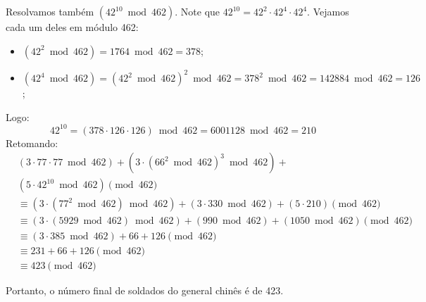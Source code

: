 Resolvamos também $(42^{10} \bmod{462})$. Note que $42^{10} = 42^2 \cdot 42^4 \cdot 42^4$. Vejamos cada um deles em módulo 462:
\begin{itemize}
	\item $(42^2 \bmod{462}) = 1764 \bmod{462} = 378$;
	\item $(42^4 \bmod{462}) = (42^2 \bmod{462})^2 \bmod{462} = 378^2 \bmod{462} = 142884 \bmod{462} = 126$;
\end{itemize}
Logo:
\begin{displaymath}
	42^{10} = (378 \cdot 126 \cdot 126) \bmod{462} = 6001128 \bmod{462} = 210
\end{displaymath}
Retomando:
\begin{align*}
	&(3 \cdot 77 \cdot 77 \bmod{462}) + (3 \cdot (66^2 \bmod{462})^3 \bmod{462}) + \\& (5 \cdot 42^{10} \bmod{462}) \pmod{462} \\ &\equiv (3 \cdot (77^2 \bmod{462}) \bmod{462}) + (3 \cdot 330 \bmod{462}) + (5 \cdot 210) \pmod{462} \\ 
	&\equiv (3 \cdot (5929 \bmod{462}) \bmod{462}) + (990 \bmod{462}) + (1050 \bmod{462}) \pmod{462} \\ 
	&\equiv (3 \cdot 385 \bmod{462}) + 66 + 126 \pmod{462} \\
	&\equiv 231 + 66 + 126 \pmod{462} \\
	&\equiv 423 \pmod{462}
\end{align*}

Portanto, o número final de soldados do general chinês é de 423.
